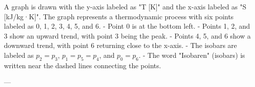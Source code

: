 A graph is drawn with the y-axis labeled as "T [K]" and the x-axis labeled as "S [kJ/kg·K]". The graph represents a thermodynamic process with six points labeled as 0, 1, 2, 3, 4, 5, and 6.  
- Point 0 is at the bottom left.  
- Points 1, 2, and 3 show an upward trend, with point 3 being the peak.  
- Points 4, 5, and 6 show a downward trend, with point 6 returning close to the x-axis.  
- The isobars are labeled as \( p_2 = p_3 \), \( p_1 = p_5 = p_4 \), and \( p_0 = p_6 \).  
- The word "Isobaren" (isobars) is written near the dashed lines connecting the points.  

---